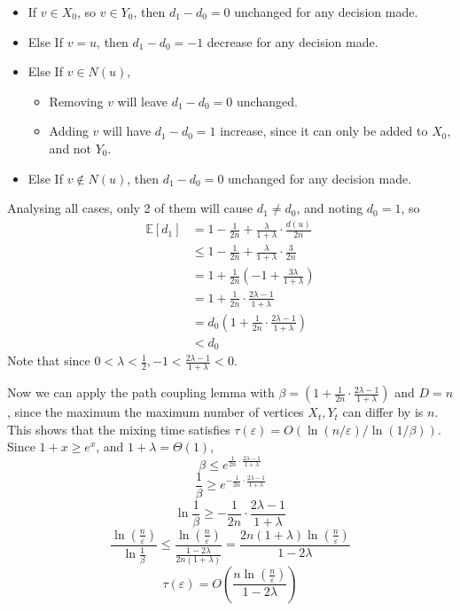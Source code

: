 \documentclass[11pt]{article} %
\begin{document}
\begin{itemize}
    \item If $v\in X_0$, so $v\in Y_0$, then $d_1-d_0=0$ unchanged for any decision made.
    \item Else If $v=u$, then $d_1-d_0=-1$ decrease for any decision made.
    \item Else If $v\in N(u)$,
    \begin{itemize}
        \item Removing $v$ will leave $d_1-d_0=0$ unchanged.
        \item Adding $v$ will have $d_1-d_0=1$ increase, since it can only be added to $X_0$, and not $Y_0$.
    \end{itemize}
    \item Else If $v \notin N(u)$, then $d_1-d_0=0$ unchanged for any decision made.
\end{itemize}

Analysing all cases, only 2 of them will cause $d_1 \neq d_0$, and noting $d_0=1$, so
\begin{equation}
\begin{aligned}
\mathbb{E}[d_1] &=1-\frac{1}{2n}+\frac{\lambda}{1+\lambda}\cdot \frac{d(u)}{2n}\\
&\leq 1 -\frac{1}{2n}+\frac{\lambda}{1+\lambda}\cdot \frac{3}{2n}\\
&=1 + \frac{1}{2n}\left(-1+\frac{3\lambda}{1+\lambda}\right)\\
&=1 + \frac{1}{2n}\cdot\frac{2\lambda - 1}{1+\lambda}\\
&=d_0\left(1 + \frac{1}{2n}\cdot\frac{2\lambda - 1}{1+\lambda}\right)\\
&< d_0
\end{aligned}
\end{equation}
Note that since $0<\lambda<\frac{1}{2}, -1<\frac{2\lambda - 1}{1+\lambda}<0$.

Now we can apply the path coupling lemma with 
$\beta = \left(1 + \frac{1}{2n}\cdot\frac{2\lambda - 1}{1+\lambda}\right)$
and $D=n$, since the maximum the maximum number of vertices $X_t,Y_t$ can differ by is $n$.
This shows that the mixing time satisfies $\tau(\varepsilon)=O(\ln(n/\varepsilon)/\ln(1/\beta))$.
Since $1+x\geq e^x$, and $1+\lambda=\Theta(1)$,
\[\beta \leq e^{\frac{1}{2n}\cdot\frac{2\lambda-1}{1+\lambda}}\]
\[\frac{1}{\beta} \geq e^{-\frac{1}{2n}\cdot\frac{2\lambda-1}{1+\lambda}}\]
\[\ln\frac{1}{\beta} \geq -\frac{1}{2n}\cdot\frac{2\lambda-1}{1+\lambda}\]
\[\frac{\ln(\frac{n}{\varepsilon})}{\ln\frac{1}{\beta}} 
\leq \frac{\ln(\frac{n}{\varepsilon})}{\frac{1-2\lambda}{2n(1+\lambda)}}
= \frac{2n(1+\lambda)\ln(\frac{n}{\varepsilon})}{1-2\lambda}\]
\[\tau(\varepsilon)=O\left(\frac{n\ln(\frac{n}{\varepsilon})}{1-2\lambda}\right)\]
\end{document}
